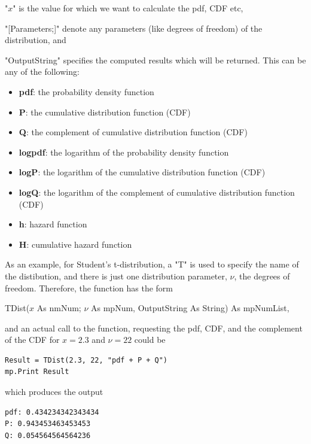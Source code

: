 "$x$" is the value for which we want to calculate the pdf, CDF etc, 

"[Parameters;]" denote any parameters (like degrees of freedom) of the distribution, and 

"OutputString" specifies the computed results which will be returned. This can be any of the following:

\begin{itemize}
	\item \textbf{pdf}: the probability density function
	\item \textbf{P}: the cumulative distribution function (CDF)
	\item \textbf{Q}: the complement of cumulative distribution function (CDF)
	\item \textbf{logpdf}: the logarithm of the probability density function
	\item \textbf{logP}: the logarithm of the cumulative distribution function (CDF)
	\item \textbf{logQ}: the logarithm of the complement of cumulative distribution function (CDF)
	\item \textbf{h}: hazard function
	\item \textbf{H}: cumulative hazard function
\end{itemize}


\vspace{0.3cm}
As an example, for Student's t-distribution, a "T" is used to specify the name of the distibution, and there is just one distribution parameter, $\nu$, the degrees of freedom. Therefore,  the function has the form

\vspace{0.3cm}
\textsf{TDist($x$ As nmNum; $\nu$ As mpNum, OutputString As String) As mpNumList}, 

\vspace{0.3cm}
and an actual call to the function, requesting the pdf, CDF, and the complement of the CDF for $x=2.3$ and $\nu=22$ could be

\begin{lstlisting}
Result = TDist(2.3, 22, "pdf + P + Q")
mp.Print Result
\end{lstlisting}
which produces the output

\begin{verbatim}
pdf: 0.434234342343434
P: 0.943453463453453
Q: 0.054564564564236
\end{verbatim}




